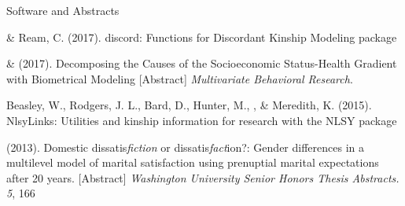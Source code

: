 \begin{rSection}{\textrm{Software and Abstracts}}%
\begin{etaremune}
\item\meb \& Ream, C.  (2017). discord: Functions for Discordant Kinship Modeling \R package \href{https://CRAN.R-project.org/package=discord}{\color{blue}{https://CRAN.R-project.org/package=discord}}
\item\meb \& \joe (2017). Decomposing the Causes of the Socioeconomic Status-Health Gradient with Biometrical Modeling [Abstract] \textit{Multivariate Behavioral Research}.
\item  Beasley, W., Rodgers, J. L., Bard, D., Hunter, M., \meb, \& Meredith, K. (2015). NlsyLinks: Utilities and kinship information for research with the NLSY \R package \href{https://cran.r-project.org/web/packages/NlsyLinks}{\color{blue}{https://cran.r-project.org/web/packages/NlsyLinks}}
\item\meb (2013). Domestic dissatis{\em fiction} or dissatis{\em fact}ion?: Gender differences in a multilevel model of marital satisfaction using prenuptial marital expectations after 20 years. [Abstract] {\em Washington University Senior Honors Thesis Abstracts. 5}, 166
\end{etaremune}
\end{rSection}